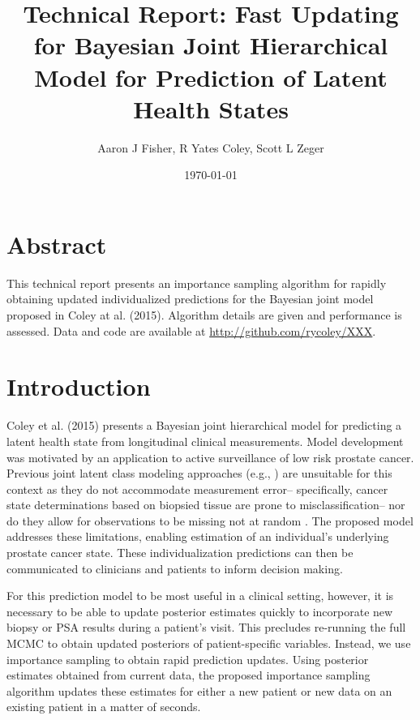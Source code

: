 \documentclass[letterpaper]{article}
\begin{document}
\title{Technical Report: Fast Updating for Bayesian Joint Hierarchical Model for Prediction of Latent Health States}
\author{ Aaron J Fisher, R Yates Coley, Scott L Zeger}
\date{\today}

\maketitle


\section*{Abstract}
This technical report presents an importance sampling algorithm for rapidly obtaining updated individualized predictions for the Bayesian joint model proposed in Coley at al. (2015). Algorithm details are given and performance is assessed. Data and code are available at \url{http://github.com/rycoley/XXX}.

\smallskip{}



\section{Introduction}
Coley et al. (2015) presents a Bayesian joint hierarchical model for predicting a latent health state from longitudinal clinical measurements. Model development was motivated by an application to active surveillance of low risk prostate cancer. Previous joint latent class modeling approaches (e.g., \cite{Lin2002}) are unsuitable for this context as they do not accommodate measurement error-- specifically, cancer state determinations based on biopsied tissue are prone to misclassification-- nor do they allow for observations to be missing not at random \cite{Little2014}. The proposed model addresses these limitations, enabling estimation of an individual's underlying prostate cancer state. These individualization predictions can then be communicated to clinicians and patients to inform decision making.  

For this prediction model to be most useful in a clinical setting, however, it is necessary to be able to update posterior estimates quickly to incorporate new biopsy or PSA results during a patient's visit. This precludes re-running the full MCMC to obtain updated posteriors of patient-specific variables. Instead, we use importance sampling \cite{Bishop2006} to obtain rapid prediction updates. Using posterior estimates obtained from current data, the proposed importance sampling algorithm updates these estimates for either a new patient or new data on an existing patient in a matter of seconds. 
\end{document}
